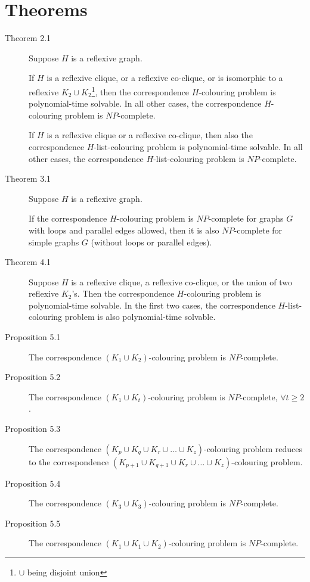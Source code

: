 \documentclass{fit-teorsem}
\begin{document}
\section*{Theorems}
\begin{description}
	\item[Theorem 2.1] Suppose $H$ is a reflexive graph.

		If $H$ is a reflexive clique, or a reflexive co-clique, or is isomorphic to a reflexive $K_2 \cup K_2$\footnote{$\cup$ being disjoint union}, then the correspondence $H$-colouring problem is polynomial-time solvable. In all other cases, the correspondence $H$-colouring problem is $NP$-complete.

		If $H$ is a reflexive clique or a reflexive co-clique, then also the correspondence $H$-list-colouring problem is polynomial-time solvable. In all other cases, the correspondence $H$-list-colouring problem is $NP$-complete.

	\item[Theorem 3.1] Suppose $H$ is a reflexive graph.

		If the correspondence $H$-colouring problem is $NP$-complete for graphs $G$ with loops and parallel edges allowed, then it is also $NP$-complete for simple graphs $G$ (without loops or parallel edges).

	\item[Theorem 4.1] Suppose $H$ is a reflexive clique, a reflexive co-clique, or the union of two reflexive $K_2$'s. Then the correspondence $H$-colouring problem is polynomial-time solvable. In the first two cases, the correspondence $H$-list-colouring problem is also polynomial-time solvable.

	\item[Proposition 5.1] The correspondence $(K_1 \cup K_2)$-colouring problem is $NP$-complete.

	\item[Proposition 5.2] The correspondence $(K_1 \cup K_t)$-colouring problem is $NP$-complete,
		$\forall t \ge 2$.

	\item[Proposition 5.3] The correspondence $(K_p \cup K_q \cup K_r \cup \dots \cup K_z)$-colouring
		problem reduces to the correspondence
		$(K_{p + 1} \cup K_{q + 1} \cup K_r \cup \dots \cup K_z)$-colouring problem.

	\item[Proposition 5.4] The correspondence $(K_3 \cup K_3)$-colouring problem is $NP$-complete.

	\item[Proposition 5.5] The correspondence $(K_1 \cup K_1 \cup K_2)$-colouring problem is $NP$-complete.


\end{description}
\end{document}
